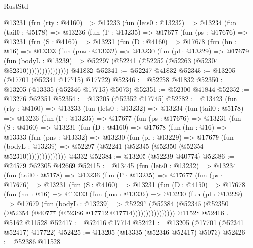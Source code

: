 \begin{lexlean}{RustStd}
\begin{coremodule}
    @13231
      (fun (rty : @4160) =>
      @13233
        (fun (lets0 : @13232) =>
        @13234
          (fun (tail0 : @5178) =>
          @13236
            (fun (Γ : @13235) =>
            @17677
              (fun (ps : @17676) =>
              @13231
                (fun (S : @4160) =>
                @13231
                  (fun (D : @4160) =>
                  @17678
                    (fun (hn : @16) =>
                    @13333
                      (fun (pns : @13332) =>
                      @13230
                        (fun (pl : @13229) =>
                        @17679
                          (fun (bodyL : @13239) =>
                          @52297 (@52241 (@52252 (@52263 (@52304 @52310))))))))))))))))
    @41832
@52341 := @52247 @41832
@52345 := @13205 (@17701 (@52341 @17715) @17722)
@52346 := @52258 @41832
@52350 := @13205 (@13335 (@52346 @17715) @5073)
@52351 := @52300 @41844
@52352 := @13276 @52351
@52354 := @13205 (@52352 @17745)
@52382 := @13423
    (fun (rty : @4160) =>
    @13233
      (fun (lets0 : @13232) =>
      @13234
        (fun (tail0 : @5178) =>
        @13236
          (fun (Γ : @13235) =>
          @17677
            (fun (ps : @17676) =>
            @13231
              (fun (S : @4160) =>
              @13231
                (fun (D : @4160) =>
                @17678
                  (fun (hn : @16) =>
                  @13333
                    (fun (pns : @13332) =>
                    @13230
                      (fun (pl : @13229) =>
                      @17679
                        (fun (bodyL : @13239) =>
                        @52297 (@52241 (@52345 (@52350 (@52354 @52310)))))))))))))))
    @4332
@52384 := @13205 (@52239 @40774)
@52386 := @24579 @52305 @42669
@52415 := @13445
    (fun (lets0 : @13232) =>
    @13234
      (fun (tail0 : @5178) =>
      @13236
        (fun (Γ : @13235) =>
        @17677
          (fun (ps : @17676) =>
          @13231
            (fun (S : @4160) =>
            @13231
              (fun (D : @4160) =>
              @17678
                (fun (hn : @16) =>
                @13333
                  (fun (pns : @13332) =>
                  @13230
                    (fun (pl : @13229) =>
                    @17679
                      (fun (bodyL : @13239) =>
                      @52297
                        (@52384
                          (@52345 (@52350 (@52354 (@40777 (@52386 @17712 @17714))))))))))))))))
    @11528
@52416 := @5162 @11528
@52417 := @52416 @17714
@52421 := @13205 (@17701 (@52341 @52417) @17722)
@52425 := @13205 (@13335 (@52346 @52417) @5073)
@52426 := @52386 @11528

\end{coremodule}
\end{lexlean}
